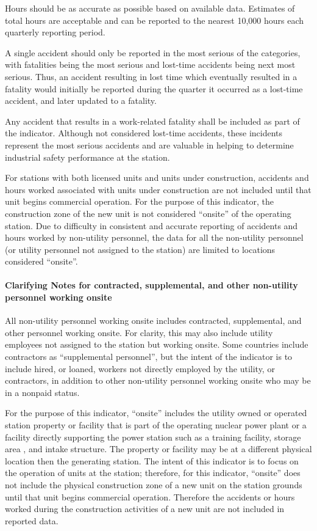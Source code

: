 Hours should be as accurate as possible based on available
data. Estimates of total hours are acceptable and can be reported to
the nearest 10,000 hours each quarterly reporting period.

A single accident should only be reported in the most serious of the
categories, with fatalities being the most serious and lost-time
accidents being next most serious. Thus, an accident resulting in lost
time which eventually resulted in a fatality would initially be
reported during the quarter it occurred as a lost-time accident, and
later updated to a fatality.

Any accident that results in a work-related fatality shall be included
as part of the indicator. Although not considered lost-time accidents,
these incidents represent the most serious accidents and are valuable
in helping to determine industrial safety performance at the station.

For stations with both licensed units and units under construction, accidents and hours worked associated with units under construction are not included until that unit begins commercial operation. For the purpose of this indicator, the construction zone of the new unit is not considered “onsite” of the operating station.
Due to difficulty in consistent and accurate reporting of accidents
and hours worked by non-utility personnel, the data for all the
non-utility personnel (or utility personnel not assigned to the
station) are limited to locations considered “onsite”.

\paragraph{Clarifying Notes for contracted, supplemental, and other
  non-utility personnel working onsite}

All non-utility personnel working onsite includes contracted,
supplemental, and other personnel working onsite. For clarity, this
may also include utility employees not assigned to the station but
working onsite.   Some countries include contractors as “supplemental
personnel”, but the intent of the indicator is to include hired, or
loaned, workers not directly employed by the utility, or contractors,
in addition to other non-utility personnel working onsite who may be
in a nonpaid status.

For the purpose of this indicator, “onsite” includes the utility owned
or operated station property or facility that is part of the operating
nuclear power plant or a facility directly supporting the power
station such as a training facility, storage area , and intake
structure. The property or facility may be at a different physical
location then the generating station. The intent of this indicator is
to focus on the operation of units at the station; therefore, for this
indicator, “onsite” does not include the physical construction zone of
a new unit on the station grounds until that unit begins commercial
operation. Therefore the accidents or hours worked during the
construction activities of a new unit are not included in reported
data.

